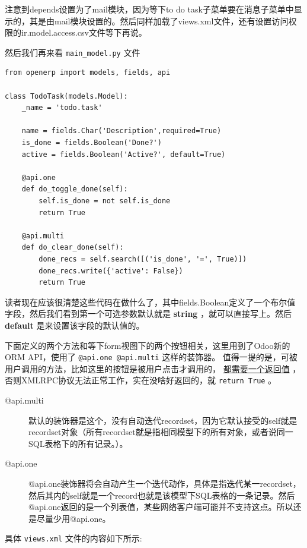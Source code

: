 \documentclass[11pt,a4paper]{sphinxmanual}
\begin{document}
注意到depends设置为了mail模块，因为等下to do task子菜单要在消息子菜单中显示的，其是由mail模块设置的。然后同样加载了views.xml文件，还有设置访问权限的ir.model.access.csv文件等下再说。

然后我们再来看 \verb~main_model.py~ 文件

\begin{verbatim}
from openerp import models, fields, api

class TodoTask(models.Model):
    _name = 'todo.task'

    name = fields.Char('Description',required=True)
    is_done = fields.Boolean('Done?')
    active = fields.Boolean('Active?', default=True)

    @api.one
    def do_toggle_done(self):
        self.is_done = not self.is_done
        return True

    @api.multi
    def do_clear_done(self):
        done_recs = self.search([('is_done', '=', True)])
        done_recs.write({'active': False})
        return True
\end{verbatim}

读者现在应该很清楚这些代码在做什么了，其中fields.Boolean定义了一个布尔值字段，然后我们看到第一个可选参数默认就是 \textbf{string} ，就可以直接写上。然后 \textbf{default} 是来设置该字段的默认值的。

下面定义的两个方法和等下form视图下的两个按钮相关，这里用到了Odoo新的ORM API，使用了 \verb~@api.one @api.multi~ 这样的装饰器。 值得一提的是，可被用户调用的方法，比如这里的按钮是被用户点击才调用的， \uline{都需要一个返回值} ，否则XMLRPC协议无法正常工作，实在没啥好返回的，就 \verb~return True~ 。

\begin{description}
\item[{@api.multi}] 默认的装饰器是这个，没有自动迭代recordset，因为它默认接受的self就是recordset对象（所有recordset就是指相同模型下的所有对象，或者说同一SQL表格下的所有记录。）。
\end{description}


\begin{description}
\item[{@api.one}] @api.one装饰器将会自动产生一个迭代动作，具体是指迭代某一recordset，然后其内的self就是一个record也就是该模型下SQL表格的一条记录。然后@api.one返回的是一个列表值，某些网络客户端可能并不支持这点。所以还是尽量少用@api.one。
\end{description}



具体 \verb~views.xml~ 文件的内容如下所示:
\end{document}
